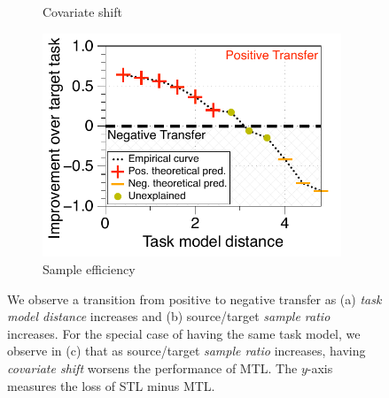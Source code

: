 \begin{figure}[!t]
\begin{subfigure}[b]{0.32\textwidth}
		\caption{Covariate shift}
		\label{fig_covariate}
	\end{subfigure}\hfill
	\begin{subfigure}[b]{0.32\textwidth}
		\centering
		\includegraphics[width=0.98\textwidth]{figures/model_shift_phase_transition.pdf}
		\caption{Sample efficiency}
		\label{fig_model_shift}
	\end{subfigure}
	\caption{%
	We observe a transition from positive to negative transfer as (a) \textit{task model distance} increases and (b) source/target \textit{sample ratio} increases.
	For the special case of having the same task model, we observe in (c) that as source/target \textit{sample ratio} increases, having \textit{covariate shift} worsens the performance of MTL.
	The $y$-axis measures the loss of STL minus MTL.}
	\label{fig_model_shift_phasetrans}
\end{figure}


